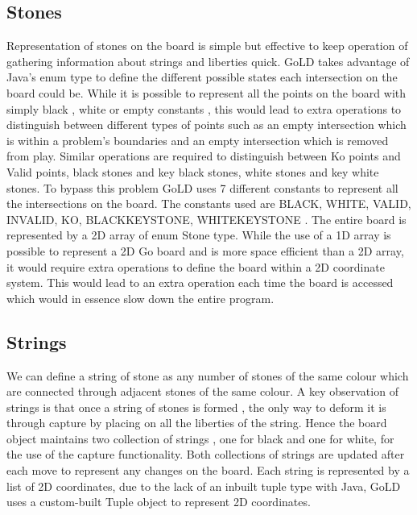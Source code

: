 \documentclass{l4proj}
\begin{document}
\subsection{Stones}
Representation of stones on the board is simple but effective to keep operation of gathering information about strings and liberties quick. GoLD takes advantage of Java’s enum type to define the different possible states each intersection on the board could be. While it is possible to represent all the points on the board with simply black , white or empty constants , this would lead to extra operations to distinguish between different types of points such as an empty intersection which is within a problem’s boundaries and an empty intersection which is removed from play. Similar operations are required to distinguish between Ko points and Valid points, black stones and key black stones, white stones and key white stones. To bypass this problem GoLD uses 7 different constants to represent all the intersections on the board. The constants used are BLACK, WHITE, VALID, INVALID, KO, BLACKKEYSTONE, WHITEKEYSTONE . The entire board is represented by a 2D array of enum Stone type. While the use of a 1D array is possible to represent a 2D Go board and is more space efficient than a 2D array, it would require extra operations to define the board within a 2D coordinate system. This would lead to an extra operation each time the board is accessed which would in essence slow down the entire program.



\subsection{Strings}
We can define a string of stone as any number of stones of the same colour which are connected through adjacent stones of the same colour. A key observation of strings is that once a string of stones is formed , the only way to deform it is through capture by placing on all the liberties of the string. Hence the board object maintains two collection of strings , one for black and one for white, for the use of the capture functionality. Both collections of strings are updated after each move to represent any changes on the board. Each string is represented by a list of 2D coordinates, due to the lack of an inbuilt tuple type with Java, GoLD uses a custom-built Tuple object to represent 2D coordinates.
\end{document}
